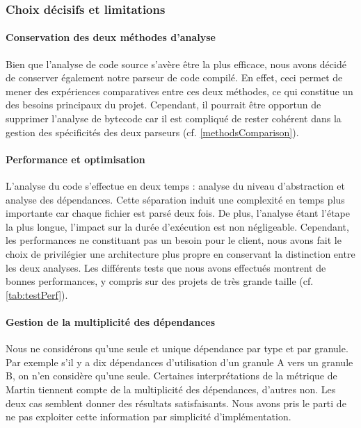 \documentclass{scrartcl}
\begin{document}
    \subsubsection{Choix décisifs et limitations}
    \label{limit}
    
        \paragraph{Conservation des deux méthodes d'analyse}Bien que l'analyse de code source s'avère être la plus efficace, nous avons décidé de conserver également notre parseur de code compilé. En effet, ceci permet de mener des expériences comparatives entre ces deux méthodes, ce qui constitue un des besoins principaux du projet. Cependant, il pourrait être opportun de supprimer l'analyse de bytecode car il est compliqué de rester cohérent dans la gestion des spécificités des deux parseurs (cf. \ref{methodsComparison}).
        
        \paragraph{Performance et optimisation}L'analyse du code s'effectue en deux temps : analyse du niveau d'abstraction et analyse des dépendances. Cette séparation induit une complexité en temps plus importante car chaque fichier est parsé deux fois. De plus, l'analyse étant l'étape la plus longue, l'impact sur la durée d'exécution est non négligeable. Cependant, les performances ne constituant pas un besoin pour le client, nous avons fait le choix de privilégier une architecture plus propre en conservant la distinction entre les deux analyses. Les différents tests que nous avons effectués montrent de bonnes performances, y compris sur des projets de très grande taille (cf. \ref{tab:testPerf}).
        
        \paragraph{Gestion de la multiplicité des dépendances}Nous ne considérons qu'une seule et unique dépendance par type et par granule. Par exemple s'il y a dix dépendances d'utilisation d'un granule A vers un granule B, on n'en considère qu'une seule. Certaines interprétations de la métrique de Martin tiennent compte de la multiplicité des dépendances\cite{Martin:2003}, d'autres non\cite{Spinellis:2006}. Les deux cas semblent donner des résultats satisfaisants. Nous avons pris le parti de ne pas exploiter cette information par simplicité d'implémentation.
        
\end{document}
